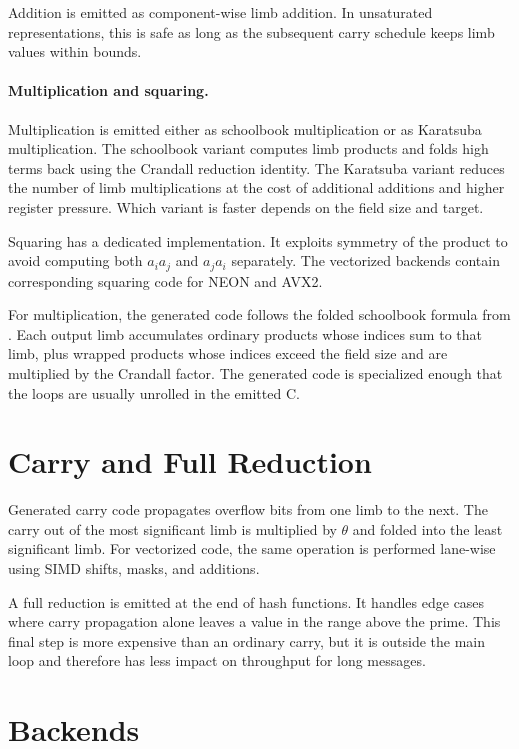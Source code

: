 Addition is emitted as component-wise limb addition. In unsaturated representations, this is safe as long as the subsequent carry schedule keeps limb values within bounds.

\paragraph{Multiplication and squaring.}
Multiplication is emitted either as schoolbook multiplication or as Karatsuba multiplication. The schoolbook variant computes limb products and folds high terms back using the Crandall reduction identity. The Karatsuba variant reduces the number of limb multiplications at the cost of additional additions and higher register pressure. Which variant is faster depends on the field size and target.

Squaring has a dedicated implementation. It exploits symmetry of the product to avoid computing both \(a_i a_j\) and \(a_j a_i\) separately. The vectorized backends contain corresponding squaring code for NEON and AVX2.

For multiplication, the generated code follows the folded schoolbook formula from . Each output limb accumulates ordinary products whose indices sum to that limb, plus wrapped products whose indices exceed the field size and are multiplied by the Crandall factor. The generated code is specialized enough that the loops are usually unrolled in the emitted C.

\section{Carry and Full Reduction}
\label{sec:carry-full-reduction}

Generated carry code propagates overflow bits from one limb to the next. The carry out of the most significant limb is multiplied by \(\theta\) and folded into the least significant limb. For vectorized code, the same operation is performed lane-wise using SIMD shifts, masks, and additions.

A full reduction is emitted at the end of hash functions. It handles edge cases where carry propagation alone leaves a value in the range above the prime. This final step is more expensive than an ordinary carry, but it is outside the main loop and therefore has less impact on throughput for long messages.

\section{Backends}
\label{sec:backends}

